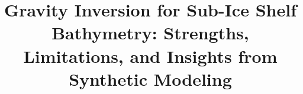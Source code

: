 \documentclass[tc, manuscript]{copernicus}
\begin{document}

\title{Gravity Inversion for Sub-Ice Shelf Bathymetry: Strengths, Limitations, and Insights from Synthetic Modeling}



\end{document}
